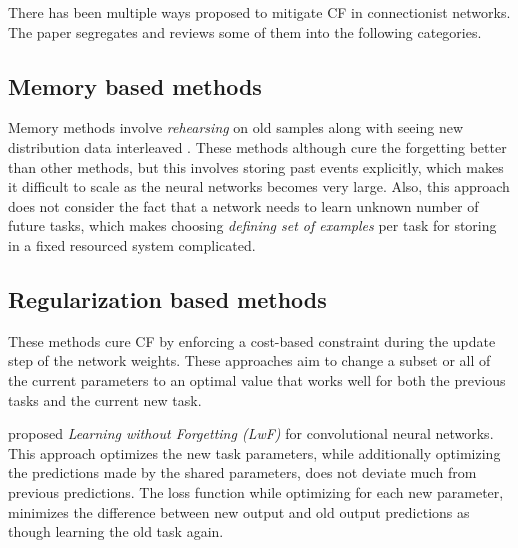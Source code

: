 \documentclass[11pt,a4paper]{article}
\begin{document}
There has been multiple ways proposed to mitigate CF in connectionist networks. The paper segregates and reviews some of them into the following categories.

\subsection{Memory based methods}
Memory methods involve \textit{rehearsing} on old samples along with seeing new distribution data interleaved \cite{Robins1995CatastrophicFR, Gepperth2016ABI}. These methods although cure the forgetting better than other methods, but this involves storing past events explicitly, which makes it difficult to scale as the neural networks becomes very large. 
Also, this approach does not consider the fact that a network needs to learn unknown number of future tasks, which makes choosing \textit{defining set of examples} per task for storing in a fixed resourced system complicated.

\subsection{Regularization based methods}
These methods cure CF by enforcing a cost-based constraint during the update step of the network weights. These approaches aim to change a subset or all of the current parameters to an optimal value that works well for both the previous tasks and the current new task.

\citet{Li2018LearningWF} proposed \textit{Learning without Forgetting (LwF)} for convolutional neural networks. This approach optimizes the new task parameters, while additionally optimizing the predictions made by the shared parameters, does not deviate much from previous predictions. The loss function while optimizing for each new parameter, minimizes the difference between new output and old output predictions as though learning the old task again. 

\end{document}
